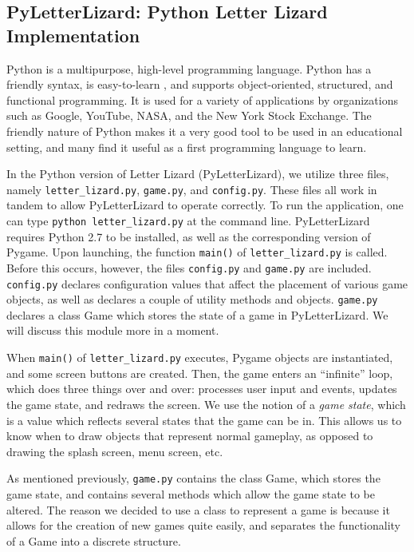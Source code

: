 
\subsection{PyLetterLizard: Python Letter Lizard Implementation}

Python is a multipurpose, high-level programming language. Python has a friendly syntax, is easy-to-learn \cite{about_python}, and supports object-oriented, structured, and functional programming. It is used for a variety of applications \cite{whatis_python} by organizations such as Google, YouTube, NASA, and the New York Stock Exchange. The friendly nature of Python makes it a very good tool to be used in an educational setting, and many find it useful as a first programming language to learn.
		
	In the Python version of Letter Lizard (PyLetterLizard), we utilize three files, namely \texttt{letter\_lizard.py}, \texttt{game.py}, and \texttt{config.py}. These files all work in tandem to allow PyLetterLizard to operate correctly. To run the application, one can type \texttt{python letter\_lizard.py} at the command line. PyLetterLizard requires Python 2.7 to be installed, as well as the corresponding version of Pygame.  Upon launching, the function \texttt{main()} of \texttt{letter\_lizard.py} is called. Before this occurs, however, the files \texttt{config.py} and \texttt{game.py} are included. \texttt{config.py} declares configuration values that affect the placement of various game objects, as well as declares a couple of utility methods and objects. \texttt{game.py} declares a class Game which stores the state of a game in PyLetterLizard. We will discuss this module more in a moment.
	
	When \texttt{main()} of \texttt{letter\_lizard.py} executes, Pygame objects are instantiated, and some screen buttons are created. Then, the game enters an ``infinite'' loop, which does three things over and over: processes user input and events, updates the game state, and redraws the screen. We use the notion of a \emph{game state}, which is a value which reflects several states that the game can be in. This allows us to know when to draw objects that represent normal gameplay, as opposed to drawing the splash screen, menu screen, etc.
	
	As mentioned previously, \texttt{game.py} contains the class Game, which stores the game state, and contains several methods which allow the game state to be altered. The reason we decided to use a class to represent a game is because it allows for the creation of new games quite easily, and separates the functionality of a Game into a discrete structure.
	
